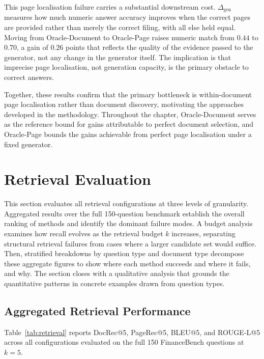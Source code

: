 \documentclass[12pt,twoside,maitrise]{dms}
\newcounter{example}
\theoremstyle{definition}
\numberwithin{equation}{section}
\numberwithin{table}{chapter}
\numberwithin{figure}{chapter}
\begin{document}
This page localisation failure carries a substantial downstream cost. $\Delta_{\mathrm{gen}}$
measures how much numeric answer accuracy improves when the correct pages are provided rather
than merely the correct filing, with all else held equal. Moving from Oracle-Document
to Oracle-Page raises numeric match from $0.44$ to $0.70$, a gain of $0.26$ points
that reflects the quality of the evidence passed to the generator, not any change in
the generator itself. The implication is that imprecise page localisation, not
generation capacity, is the primary obstacle to correct answers.

Together, these results confirm that the primary bottleneck is within-document page
localisation rather than document discovery, motivating the approaches developed in the methodology. Throughout the chapter,
Oracle-Document serves as the reference bound for gains attributable to perfect document
selection, and Oracle-Page bounds the gains achievable from perfect page localisation
under a fixed generator.
\section{Retrieval Evaluation}
\label{sec:retrieval_results}

This section evaluates all retrieval configurations at three levels of granularity.
Aggregated results over the full 150-question benchmark establish the overall ranking
of methods and identify the dominant failure modes. A budget analysis examines how recall
evolves as the retrieval budget $k$ increases, separating structural retrieval failures
from cases where a larger candidate set would suffice. Then, stratified breakdowns by question
type and document type decompose these aggregate figures to show where each
method succeeds and where it fails, and why. The section closes with a
qualitative analysis that grounds the quantitative patterns in concrete
examples drawn from question types.

\subsection{Aggregated Retrieval Performance}
\label{sec:agg_retrieval}

Table~\ref{tab:retrieval} reports DocRec@5, PageRec@5, BLEU@5, and ROUGE-L@5 across all
configurations evaluated on the full 150 FinanceBench questions at $k=5$.
\end{document}
